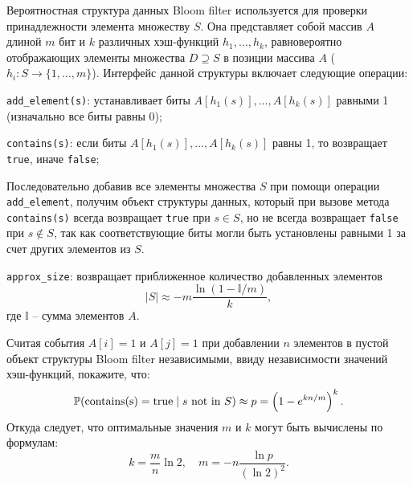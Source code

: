 \begin{problem}
Вероятностная структура данных Bloom filter используется для проверки принадлежности элемента множеству $S$. Она представляет собой массив $A$ длиной $m$ бит и $k$ различных хэш-функций $h_1, \ldots, h_k$, равновероятно отображающих элементы множества  $D \supseteq S$ в позиции массива $A$ ($h_i: S \to \{1, \ldots, m\}$). 
Интерфейс данной структуры включает следующие операции:

\verb|add_element(s)|: устанавливает биты $A[h_1(s)], \ldots, A[h_k(s)]$ равными 1 (изначально все биты равны 0);

\verb|contains(s)|: если биты $A[h_1(s)], \ldots, A[h_k(s)]$ равны 1, то возвращает \verb|true|, иначе \verb|false|;

Последовательно добавив все элементы множества $S$ при помощи операции \verb|add_element|, получим объект структуры данных, который при вызове метода \verb|contains(s)| всегда возвращает \verb|true| при $s \in S$, но не всегда возвращает \verb|false| при  $s \notin S$, так как соответствующие биты могли быть установлены равными 1 за счет других элементов из $S$.     

\verb|approx_size|: возвращает приближенное количество добавленных элементов
 \[
 |S| \approx  - m \frac{\ln (1 - \mathbb{I}/m)}{k},
 \] 
где $\mathbb{I}$ -- сумма элементов $A$. 



Считая события $A[i] = 1$ и $A[j] = 1$ при добавлении $n$ элементов в пустой объект структуры Bloom filter  независимыми, ввиду независимости значений хэш-функций, покажите, что:
\[
\mathrm{{\mathbb P}}(\text{contains(s)} = \text{true} \; | \; s \text{ not in } S) \approx p =  \left( 1 - e^{k n / m} \right)^k.
\]   
Откуда следует, что оптимальные значения $m$ и $k$ могут быть вычислены по формулам:
\[
k = \frac{m}{n} \ln 2, \quad m = -n \frac{\ln p}{(\ln 2)^2}.
\]
\end{problem}

